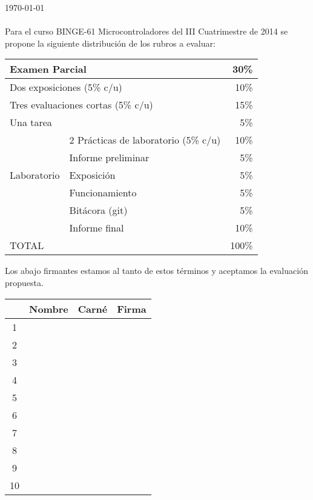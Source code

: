 \documentclass[letterpaper,12pt]{article}
\begin{document}
\noindent\today\\~\\

Para el curso BINGE-61 Microcontroladores del III Cuatrimestre de 2014 se propone la siguiente distribución de los rubros a evaluar:

\begin{center}
\begin{tabular}{|l|l|r|}\hline
\multicolumn{2}{|l|}{Examen Parcial}		&	30\%\\\hline
\multicolumn{2}{|l|}{Dos exposiciones (5\% c/u)}&	10\%\\\hline
\multicolumn{2}{|l|}{Tres evaluaciones cortas (5\% c/u)}	&	15\%\\\hline
\multicolumn{2}{|l|}{Una tarea}			&	 5\%\\\hline
		    & 2 Prácticas de laboratorio (5\% c/u) 	&	 10\%\\\cline{2-3}
		    & Informe preliminar	&	 5\%\\\cline{2-3}
Laboratorio	    & Exposición &	5\%\\\cline{2-3}
			& Funcionamiento &	5\%\\\cline{2-3}
		    & Bitácora (git)		&	 5\%\\\cline{2-3}
		    & Informe final		&	10\%\\\hline\hline
\multicolumn{2}{|l|}{TOTAL}			&	100\%\\\hline
\end{tabular}
\end{center}

Los abajo firmantes estamos al tanto de estos términos y aceptamos la evaluación propuesta.

\begin{center}
\begin{tabular}{|c|p{}|p{}|p{}|}
\hline
 & Nombre & Carné & Firma\\\hline

1&  & & \\[0.4cm]\hline
2&  & & \\[0.4cm]\hline
3&  & & \\[0.4cm]\hline
4&  & & \\[0.4cm]\hline
5&  & & \\[0.4cm]\hline
6&  & & \\[0.4cm]\hline
7&  & & \\[0.4cm]\hline
8&  & & \\[0.4cm]\hline
9&  & & \\[0.4cm]\hline
10&  & & \\[0.4cm]\hline
 
\end{tabular}
 
\end{center}
\end{document}
